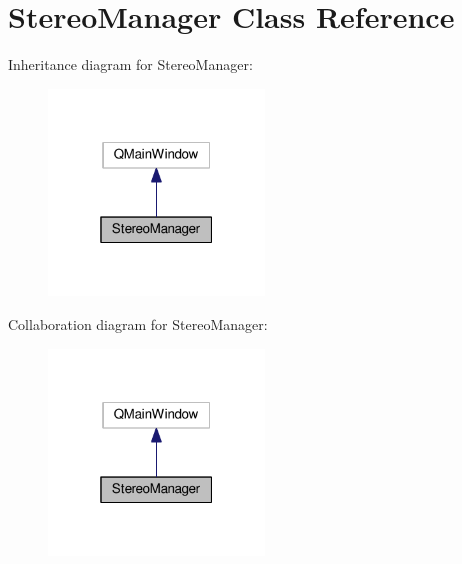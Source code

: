 \hypertarget{classStereoManager}{}\section{Stereo\+Manager Class Reference}
\label{classStereoManager}


Inheritance diagram for Stereo\+Manager\+:\nopagebreak
\begin{figure}[H]
\begin{center}
\leavevmode
\includegraphics[width=163pt]{classStereoManager__inherit__graph}
\end{center}
\end{figure}


Collaboration diagram for Stereo\+Manager\+:\nopagebreak
\begin{figure}[H]
\begin{center}
\leavevmode
\includegraphics[width=163pt]{classStereoManager__coll__graph}
\end{center}
\end{figure}
